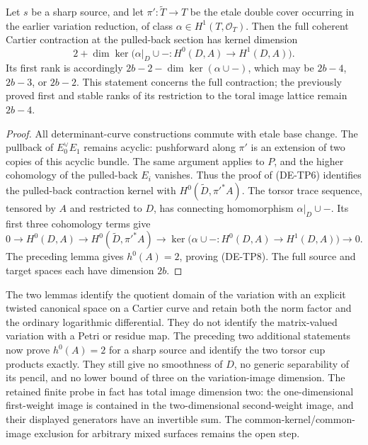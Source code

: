 \begin{corollary}
\label{cor:DE-A3-positive-first-rank-candidate}
Let $s$ be a sharp source, and let $\pi':\widetilde T\to T$ be the
etale double cover occurring in the earlier variation reduction, of
class $\alpha\in H^1(T,\mathcal O_T)$. Then the full coherent
Cartier contraction at the pulled-back section has kernel dimension
\[
        2+\dim\ker\bigl(\alpha|_D\cup-:
                     H^0(D,A)\longrightarrow H^1(D,A)\bigr).
                                                        \tag{DE-TP8}
\]
Its first rank is accordingly
$2b-2-\dim\ker(\alpha\cup-)$, which may be $2b-4$, $2b-3$,
or $2b-2$. This statement concerns the full contraction;
the previously proved first and stable ranks of its restriction
to the toral image lattice remain $2b-4$.
\end{corollary}
\begin{proof}
All determinant-curve constructions commute with etale base change.
The pullback of $E_0^\vee E_1$ remains acyclic: pushforward along
$\pi'$ is an extension of two copies of this acyclic bundle.
The same argument applies to $P$, and the higher cohomology
of the pulled-back $E_i$ vanishes. Thus the proof of (DE-TP6)
identifies the pulled-back contraction kernel with
$H^0(\widetilde D,\pi'^*A)$.
The torsor trace sequence, tensored by $A$ and restricted to $D$,
has connecting homomorphism $\alpha|_D\cup-$. Its first three
cohomology terms give
\[
 0\longrightarrow H^0(D,A)\longrightarrow
 H^0(\widetilde D,\pi'^*A)\longrightarrow
 \ker\bigl(\alpha\cup-:H^0(D,A)\to H^1(D,A)\bigr)
 \longrightarrow0.
\]
The preceding lemma gives $h^0(A)=2$, proving (DE-TP8).
The full source and target spaces each have dimension $2b$.
\end{proof}

\begin{remark}
\label{rem:DE-A3-positive-norm-pencil-scope-candidate}
The two lemmas identify the quotient domain of the variation with an
explicit twisted canonical space on a Cartier curve and retain both
the norm factor and the ordinary logarithmic differential. They do
not identify the matrix-valued variation with a Petri or residue map.
The preceding two additional statements now prove $h^0(A)=2$
for a sharp source and identify the two torsor cup products exactly.
They still give no smoothness of $D$, no generic separability of its
pencil, and no lower bound of three on the variation-image dimension.
The retained finite probe in fact has total image dimension two:
the one-dimensional first-weight image is contained in the
two-dimensional second-weight image, and their displayed generators
have an invertible sum. The common-kernel/common-image exclusion
for arbitrary mixed surfaces remains the open step.
\end{remark}
